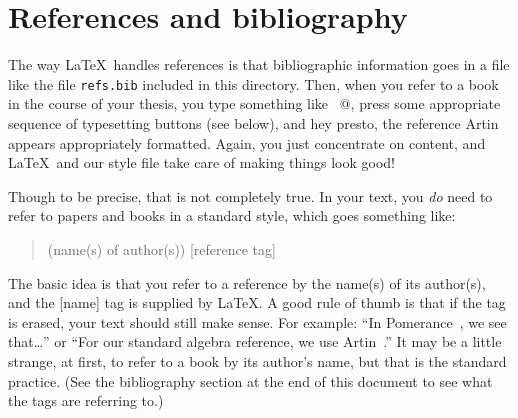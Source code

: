 \documentclass[modernstyle,12pt]{sjsuthesis}
\theoremstyle{definition}
\begin{document}
\section{References and bibliography}

The way \LaTeX\ handles references is that bibliographic information
goes in a file like the file {\tt refs.bib\/} included in this
directory.  Then, when you refer to a book in the course of your
thesis, you type something like \verb@Artin~\cite{Artin:Algebra}@,
press some appropriate sequence of typesetting buttons (see below),
and hey presto, the reference Artin~\cite{Artin:Algebra} appears
appropriately formatted.  Again, you just concentrate on content, and
\LaTeX\ and our style file take care of making things look good!

Though to be precise, that is not completely true.  In your text, you
{\it do\/} need to refer to papers and books in a standard style,
which goes something like:
\begin{quotation}
  (name(s) of author(s)) [reference tag]
\end{quotation}
The basic idea is that you refer to a reference by the name(s) of its
author(s), and the [name] tag is supplied by \LaTeX.  A good rule of
thumb is that if the tag is erased, your text should still make sense.
For example: ``In Pomerance~\cite{Pomerance:Sieve}, we see
that\ldots'' or ``For our standard algebra reference, we use
Artin~\cite[Ch.\ 2]{Artin:Algebra}.''  It may be a little strange, at
first, to refer to a book by its author's name, but that is the
standard practice.  (See the bibliography section at the end of this
document to see what the tags are referring to.)
\end{document}
